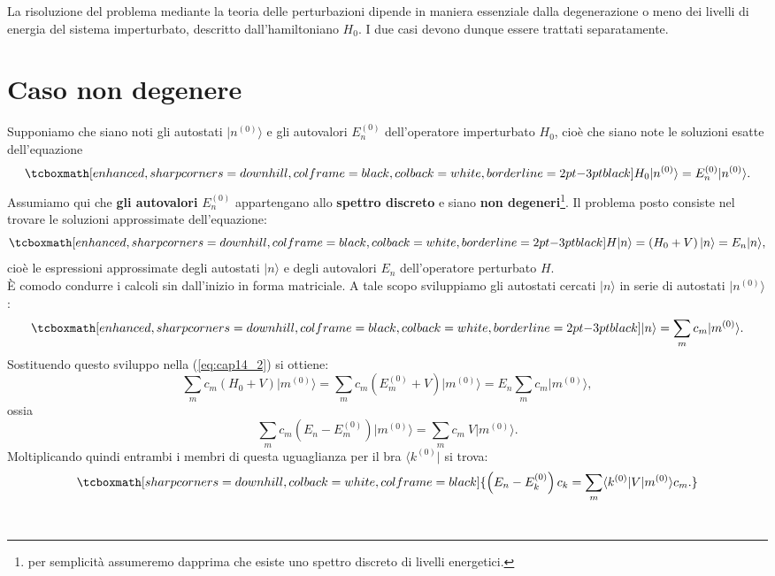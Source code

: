\documentclass[a4paper,12pt,oneside]{book}
\begin{document}
La risoluzione del problema mediante la teoria delle perturbazioni dipende in maniera essenziale dalla degenerazione o meno dei livelli di energia del sistema imperturbato, descritto dall'hamiltoniano $H_0$. I due casi devono dunque essere trattati separatamente.
\section{Caso non degenere}
Supponiamo che siano noti gli autostati $\vert n^{(0)} \rangle$ e gli autovalori $E_n ^{(0)}$ dell'operatore imperturbato $H_0$, cioè che siano note le soluzioni esatte dell'equazione
	\begin{equation}
		\tcboxmath[enhanced, sharp corners=downhill, colframe=black, colback=white, borderline={2pt}{-3pt}{black}]{
			H_0\vert n^{(0)} \rangle=E_n ^{(0)}\vert n^{(0)} \rangle.
			}
	\label{eq:cap14_1}
	\end{equation}
Assumiamo qui che \textbf{gli autovalori} $E_n ^{(0)}$ appartengano allo \textbf{spettro discreto} e siano \textbf{non degeneri}\footnote{per semplicità assumeremo dapprima che esiste uno spettro discreto di livelli energetici.}. Il problema posto consiste nel trovare le soluzioni approssimate dell'equazione:
	\begin{equation}
		\tcboxmath[enhanced, sharp corners=downhill, colframe=black, colback=white, borderline={2pt}{-3pt}{black}]{
			H\vert n \rangle=\left( H_0+ V \right) \vert n \rangle= E_n \vert n \rangle,
			}
	\label{eq:cap14_2}
	\end{equation}
cioè le espressioni approssimate degli autostati $\vert n \rangle$ e degli autovalori $E_n$ dell'operatore perturbato $H$.\\

È comodo condurre i calcoli sin dall'inizio in forma matriciale. A tale scopo sviluppiamo gli autostati cercati $\vert n \rangle$ in serie di autostati $\vert n^{(0)} \rangle$:
	\begin{equation}
		\tcboxmath[enhanced, sharp corners=downhill, colframe=black, colback=white, borderline={2pt}{-3pt}{black}]{
			\vert n \rangle= \sum _m c_m \vert m^{(0)} \rangle.
			}
	\label{eq:cap14_3}
	\end{equation}
Sostituendo questo sviluppo nella (\ref{eq:cap14_2}) si ottiene:
	\begin{equation}
		\sum _m c_m \left( H_0+V\right)\vert m^{(0)} \rangle =\sum _m c_m \left( E_m ^{(0)}+V\right)\vert m^{(0)} \rangle= E_n\sum _m c_m \vert m^{(0)} \rangle,
	\end{equation}
ossia
	\begin{equation}
		\sum _m c_m \left( E_n-E_m ^{(0)}\right)\vert m^{(0)}\rangle=\sum _m c_m\ V\vert m^{(0)}\rangle.
	\end{equation}
Moltiplicando quindi entrambi i membri di questa uguaglianza per il bra $\langle k^{(0)}\vert$ si trova:
	\begin{equation}
		\tcboxmath[sharp corners=downhill, colback=white, colframe=black]{
			\left( E_n-E_k ^{(0)}\right)c_k =\sum _m \langle k^{(0)}\vert V\vert m^{(0)}\rangle c_m.
			}
	\label{eq:cap14_4}
	\end{equation}\\
	
\end{document}
